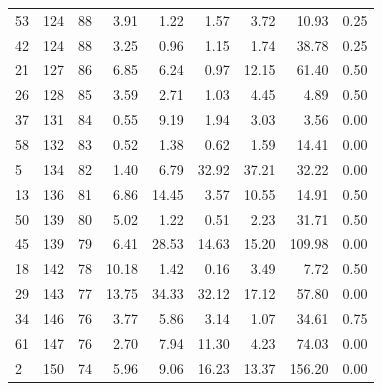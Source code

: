 \begin{tabular}{@{}l r r r r r r r l@{}}
53 & 124 & 88 & 3.91 & 1.22 & 1.57 & 3.72 & 10.93 & 0.25 \\
42 & 124 & 88 & 3.25 & 0.96 & 1.15 & 1.74 & 38.78 & 0.25 \\
21 & 127 & 86 & 6.85 & 6.24 & 0.97 & 12.15 & 61.40 & 0.50 \\
26 & 128 & 85 & 3.59 & 2.71 & 1.03 & 4.45 & 4.89 & 0.50 \\
37 & 131 & 84 & 0.55 & 9.19 & 1.94 & 3.03 & 3.56 & 0.00 \\
58 & 132 & 83 & 0.52 & 1.38 & 0.62 & 1.59 & 14.41 & 0.00 \\
5 & 134 & 82 & 1.40 & 6.79 & 32.92 & 37.21 & 32.22 & 0.00 \\
13 & 136 & 81 & 6.86 & 14.45 & 3.57 & 10.55 & 14.91 & 0.50 \\
50 & 139 & 80 & 5.02 & 1.22 & 0.51 & 2.23 & 31.71 & 0.50 \\
45 & 139 & 79 & 6.41 & 28.53 & 14.63 & 15.20 & 109.98 & 0.00 \\
18 & 142 & 78 & 10.18 & 1.42 & 0.16 & 3.49 & 7.72 & 0.50 \\
29 & 143 & 77 & 13.75 & 34.33 & 32.12 & 17.12 & 57.80 & 0.00 \\
34 & 146 & 76 & 3.77 & 5.86 & 3.14 & 1.07 & 34.61 & 0.75 \\
61 & 147 & 76 & 2.70 & 7.94 & 11.30 & 4.23 & 74.03 & 0.00 \\
2 & 150 & 74 & 5.96 & 9.06 & 16.23 & 13.37 & 156.20 & 0.00 \\
\bottomrule
\end{tabular}
